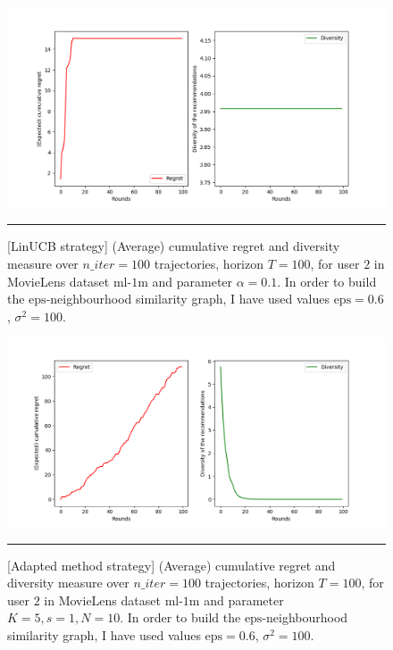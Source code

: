\documentclass{article}
\begin{document}
\begin{figure}[H]
  \centering
  \rule[-.5cm]{0cm}{4cm}
  \includegraphics[scale=0.5]{../Results/linUCB_6min4sec.png}
  \rule[-.5cm]{4cm}{0cm}
  \caption{[LinUCB strategy] (Average) cumulative regret and diversity measure over $n\_iter=100$ trajectories, horizon $T=100$, for user $2$ in MovieLens dataset $\text{ml-1m}$ and parameter $\alpha=0.1$. In order to build the $\text{eps}$-neighbourhood similarity graph, I have used values $\text{eps}=0.6$, $\sigma^{2}=100$.}
\end{figure}

\begin{figure}[H]
  \centering
  \rule[-.5cm]{0cm}{4cm}
  \includegraphics[scale=0.5]{../Results/lagree_36min16sec.png}
  \rule[-.5cm]{4cm}{0cm}
  \caption{[Adapted method strategy] (Average) cumulative regret and diversity measure over $n\_iter=100$ trajectories, horizon $T=100$, for user $2$ in MovieLens dataset $\text{ml-1m}$ and parameter $K=5, s=1, N=10$. In order to build the $\text{eps}$-neighbourhood similarity graph, I have used values $\text{eps}=0.6$, $\sigma^{2}=100$.}
\end{figure}
\end{document}
